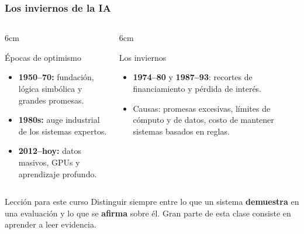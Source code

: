 \documentclass[aspectratio=169, 10pt]{beamer}
\begin{document}
\begin{frame}
\frametitle{Los inviernos de la IA}
\begin{columns}[T]
\begin{column}{6cm}
\begin{exampleblock}{Épocas de optimismo}
\begin{itemize}
	\item \textbf{1950--70:} fundaci\'on, l\'ogica simb\'olica y grandes promesas.
	\item \textbf{1980s:} auge industrial de los sistemas expertos.
	\item \textbf{2012--hoy:} datos masivos, GPUs y aprendizaje profundo.
\end{itemize}
\end{exampleblock}
\end{column}
\begin{column}{6cm}
\begin{alertblock}{Los inviernos}
\begin{itemize}
	\item \textbf{1974--80} y \textbf{1987--93}: recortes de financiamiento y p\'erdida de inter\'es.
	\item Causas: promesas excesivas, l\'imites de c\'omputo y de datos, costo de mantener sistemas basados en reglas.
\end{itemize}
\end{alertblock}
\end{column}
\end{columns}
\vspace{0.5em}
\begin{block}{Lección para este curso}
Distinguir siempre entre lo que un sistema \textbf{demuestra} en una evaluaci\'on y lo que se \textbf{afirma} sobre \'el. Gran parte de esta clase consiste en aprender a leer evidencia.
\end{block}
\end{frame}
\end{document}
